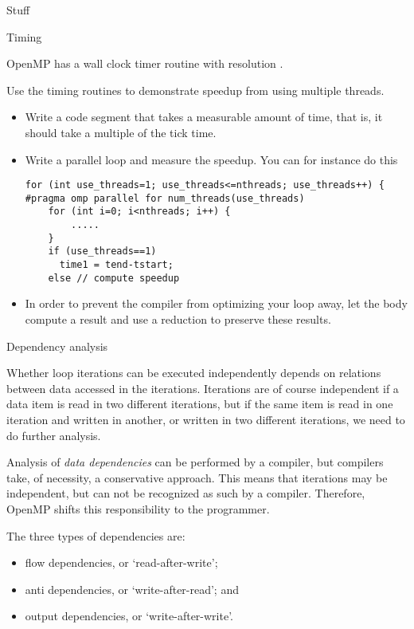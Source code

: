  {Stuff}

 {Timing}

OpenMP has a wall clock timer routine 
with resolution .

\begin{exercise}
  Use the timing routines to demonstrate speedup from using
  multiple threads.
  \begin{itemize}
  \item Write a code segment that takes a measurable amount of time, that is,
    it should take a multiple of the tick time.
  \item Write a parallel loop and measure the speedup. You can for instance do this
\begin{verbatim}
for (int use_threads=1; use_threads<=nthreads; use_threads++) {
#pragma omp parallel for num_threads(use_threads)
    for (int i=0; i<nthreads; i++) {
        .....
    }
    if (use_threads==1)
      time1 = tend-tstart;
    else // compute speedup
\end{verbatim}
\item In order to prevent the compiler from optimizing your loop away, let
  the body compute a result and use a reduction to preserve these results.
  \end{itemize}
\end{exercise}

 {Dependency analysis}

Whether loop iterations can be executed independently
depends on relations between data accessed in the iterations.
Iterations are of course independent if a data item
is read in two different iterations, but if the same
item is read in one iteration and written in another,
or written in two different iterations,
we need to do further analysis.

Analysis of \emph{data dependencies} can be performed
by a compiler, but compilers take, of necessity,
a conservative approach. This means that iterations
may be independent, but can not be recognized as such by
a compiler. Therefore, OpenMP shifts this responsibility
to the programmer.

The three types of dependencies are:
\begin{itemize}
\item flow dependencies, or `read-after-write';
\item anti dependencies, or `write-after-read'; and
\item output dependencies, or `write-after-write'.
\end{itemize}

